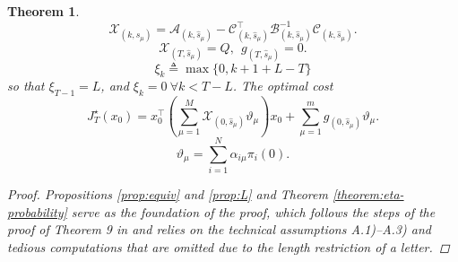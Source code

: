 \documentclass[journal,twoside,web]{ieeecolor}
\newtheorem{theorem}{Theorem}
\begin{document}
\begin{theorem}
\begin{equation}\label{eq:fh-x}
    \mathcal{X}_{(k,\hat{s}_{\mu})} = \mathcal{A}_{(k,\hat{s}_{\mu})} - \mathcal{C}_{(k,\hat{s}_{\mu})}^{\top} \mathcal{B}_{(k,\hat{s}_{\mu})}^{-1} \mathcal{C}_{(k,\hat{s}_{\mu})}.
\end{equation}    
\begin{equation}\label{eq:fh-x-g-t}
    \mathcal{X}_{(T,\hat{s}_{\mu})} = Q,~~
    g_{(T,\hat{s}_{\mu})} = 0. 
\end{equation}
\begin{equation}\label{eq:xik}
    \xi_k \triangleq \max \{0, k+1+L-T \}
\end{equation}
    so that $\xi_{T-1}=L$, and $\xi_{k} = 0~ \forall k<T-L$. The optimal cost %
\begin{equation}\label{eq:fh-cost}
   J_{T}^{\star}(x_0) = x_{0}^{\top}\left( \sum_{\mu=1}^{M}  \mathcal{X}_{(0,\hat{s}_{\mu})} \vartheta_{\mu} \right) x_{0} +
    \sum_{\mu=1}^{m} g_{(0,\hat{s}_{\mu})} \vartheta_{\mu}.
\end{equation}
\begin{equation}\label{eq:init-distrib-mu}
    \vartheta_{\mu} = \sum_{i=1}^{N} \alpha_{i\mu} \pi_{i}(0).
\end{equation}
\begin{proof}
Propositions \ref{prop:equiv} and \ref{prop:L} and Theorem \ref{theorem:eta-probability} serve as the foundation of the proof, which follows the steps of the proof of Theorem 9 in \cite{yZL-2025-automatica} and relies on the technical assumptions A.1)--A.3) and tedious computations that are omitted due to the length restriction of a letter.
\end{proof}
\end{theorem}
\end{document}
